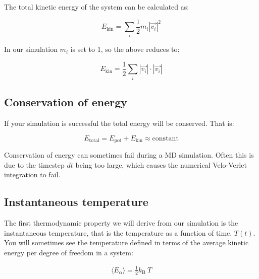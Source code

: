 \documentclass{article}
\begin{document}
The total kinetic energy of the system can be calculated as:

\begin{equation}
    E_{\mathrm{kin}} = \sum_i \frac{1}{2} m_i |\vec{v_i}|^2
\end{equation}

In our simulation $m_i$ is set to 1, so the above reduces to:

\begin{equation}
    E_{\mathrm{kin}} = \frac{1}{2} \sum_i |\vec{v_i}| \cdot |\vec{v_i}|
\end{equation}

% 
% 


\subsection{Conservation of energy}

If your simulation is successful the total energy will be conserved. That is:

\begin{equation}
    E_{\mathrm{total}} = E_{\mathrm{pot}} + E_{\mathrm{kin}} \approx \mathrm{constant}
\end{equation}

Conservation of energy can sometimes fail during a MD simulation.
Often this is due to the timestep $dt$ being too large, which causes the numerical Velo-Verlet integration to fail.


\subsection{Instantaneous temperature}

The first thermodynamic property we will derive from our simulation is the instantaneous temperature,
that is the temperature as a function of time, $T(t)$.
You will sometimes see the temperature defined in terms of the average kinetic energy per degree of freedom in a system:

\begin{eqnarray}
    \langle E_{\alpha} \rangle = \frac{1}{2} k_\mathrm{B} \ T
\end{eqnarray}
\end{document}
